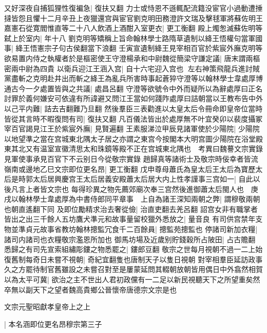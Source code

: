 又好深夜自捕狐狸性復褊急|{
	復扶又翻}
力士或恃恩不遜輒配流籍没宦官小過動遭捶撻皆怨且懼十二月辛丑上夜獵還宫與宦官劉克明田務澄許文瑞及擊毬軍將蘇佐明王嘉憲石從寛閻惟直等二十八人飲酒上酒酣入室更衣|{
	更工衡翻}
殿上燭怱滅蘇佐明等弑上於室内|{
	年十八}
劉克明等矯稱上旨命翰林學士路隋草遺制以絳王悟權句當軍國事|{
	絳王悟憲宗子句古侯翻當下浪翻}
壬寅宣遺制絳王見宰相百官於紫宸外廡克明等欲易置内侍之執權者於是樞密使王守澄楊承和中尉魏從簡梁守謙定議|{
	唐末謂兩樞密兩中尉為四貴}
以衛兵迎江王涵入宫|{
	自十六宅迎入宫也}
左右神策飛龍兵進討賊黨盡斬之克明赴井出而斬之絳王為亂兵所害時事起蒼猝守澄等以翰林學士韋處厚博通古今一夕處置皆與之共議|{
	處昌呂翻}
守澄等欲號令中外而疑所以為辭處厚曰正名討罪於義何嫌安可依違有所諱避又問江王當如何踐阼處厚曰詰朝當以王教布告中外以己平内難|{
	詰去吉翻難乃旦翻}
然後羣臣三表勸進以太皇太后令冊命即皇帝位當時皆從其言時不暇復問有司|{
	復扶又翻}
凡百儀法皆出於處厚無不叶宜癸卯以裴度攝冢宰百官謁見江王於紫宸外廡|{
	見賢遍翻}
王素服涕泣甲辰見諸軍使於少陽院|{
	少陽院以地望準之當在宫城東北隅太子居之亦謂之東宫今按閣本大明宫圖少陽院在浴堂殿東其北又有温室宣徽清思太和珠鏡等殿不正在宫城東北隅也　考異曰魏謩文宗實錄見軍使事承見百官下不云别日今從敬宗實錄}
趙歸真等諸術士及敬宗時佞幸者皆流嶺南或邊地乙巳文宗即位更名昂|{
	更工衡翻}
戊申尊母蕭氏為皇太后王太后為寶歷太后是時郭太后居興慶宫王太后居義安殿蕭太后居大内上性孝謹事三宫如一|{
	自此以後凡言上者皆文宗也}
每得珍異之物先薦郊廟次奉三宫然後進御蕭太后閩人也　庚戌以翰林學士韋處厚為中書侍郎同平章事　上自為諸王深知兩朝之弊|{
	謂穆敬兩朝也朝直遙翻下同}
及即位勵精求治去奢從儉|{
	治直吏翻去羌呂翻}
詔宫女非有職掌者皆出之出三千餘人五坊鷹犬準元和故事量留校獵外悉放之|{
	量音良}
有司供宫禁年支物並準貞元故事省教坊翰林摠監冗食千二百餘員|{
	摠監苑摠監也}
停諸司新加衣糧|{
	諸司内諸司也衣糧敬宗濫恩所加也}
御馬坊場及近歲别貯錢穀所占陂田|{
	占古贍翻}
悉歸之有司先宣索組繡彫鏤之物悉罷之|{
	鏤郎豆翻}
敬宗之世每月視朝不過一二上始復舊制每奇日未嘗不視朝|{
	奇紀宜翻隻也唐制天子以隻日視朝}
對宰相羣臣延訪政事久之方罷待制官舊雖設之未嘗召對至是屢蒙延問其輟朝放朝皆用偶日中外翕然相賀以為太平可冀|{
	欲治之主不世出人君初政儻有一二足以新民視聽天下之所望重矣然卒無以副天下之望者魏高貴鄉公晉懷帝唐德宗文宗是也}


文宗元聖昭獻孝皇帝上之上

|{
	本名涵即位更名昂穆宗第三子}


